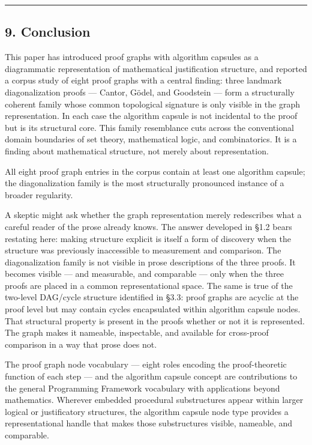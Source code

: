 \documentclass[
  11pt]{article}
\begin{document}
\begin{center}\rule{0.5\linewidth}{0.5pt}\end{center}

\hypertarget{9-conclusion}{%
\subsection{9. Conclusion}\label{9-conclusion}}

This paper has introduced proof graphs with algorithm capsules as a
diagrammatic representation of mathematical justification structure, and
reported a corpus study of eight proof graphs with a central finding:
three landmark diagonalization proofs --- Cantor, Gödel, and Goodstein
--- form a structurally coherent family whose common topological
signature is only visible in the graph representation. In each case the
algorithm capsule is not incidental to the proof but is its structural
core. This family resemblance cuts across the conventional domain
boundaries of set theory, mathematical logic, and combinatorics. It is a
finding about mathematical structure, not merely about representation.

All eight proof graph entries in the corpus contain at least one
algorithm capsule; the diagonalization family is the most structurally
pronounced instance of a broader regularity.

A skeptic might ask whether the graph representation merely redescribes
what a careful reader of the prose already knows. The answer developed
in §1.2 bears restating here: making structure explicit is itself a form
of discovery when the structure was previously inaccessible to
measurement and comparison. The diagonalization family is not visible in
prose descriptions of the three proofs. It becomes visible --- and
measurable, and comparable --- only when the three proofs are placed in
a common representational space. The same is true of the two-level
DAG/cycle structure identified in §3.3: proof graphs are acyclic at the
proof level but may contain cycles encapsulated within algorithm capsule
nodes. That structural property is present in the proofs whether or not
it is represented. The graph makes it nameable, inspectable, and
available for cross-proof comparison in a way that prose does not.

The proof graph node vocabulary --- eight roles encoding the
proof-theoretic function of each step --- and the algorithm capsule
concept are contributions to the general Programming Framework
vocabulary with applications beyond mathematics. Wherever embedded
procedural substructures appear within larger logical or justificatory
structures, the algorithm capsule node type provides a representational
handle that makes those substructures visible, nameable, and comparable.
\end{document}
